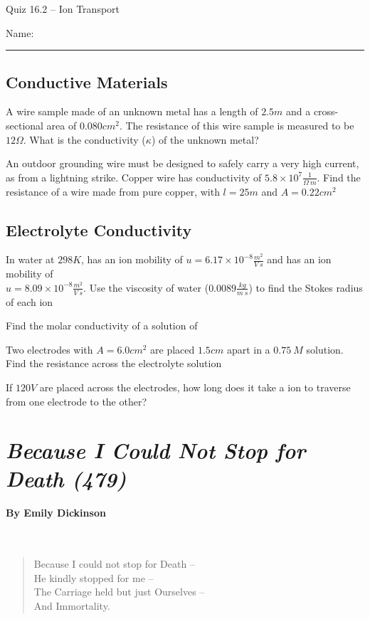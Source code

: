 \documentclass[11pt, letterpaper]{memoir}
\begin{document}
	\begin{center}
		{\large Quiz 16.2 -- Ion Transport}
	\end{center}
	{\large Name: \rule[-1mm]{4in}{.1pt} 


\subsection*{Conductive Materials}
A wire sample made of an unknown metal has a length of $2.5m$ and a cross-sectional area of $0.080cm^2$. The resistance of this wire sample is measured to be $12\Omega$. What is the conductivity ($\kappa$) of the unknown metal?

\vspace{4em}\noindent
An outdoor grounding wire must be designed to safely carry a very high current, as from a lightning strike. Copper wire has conductivity of $5.8\times10^7\frac{1}{\Omega~m}$. Find the resistance of a wire made from pure copper, with $l=25m$ and $A=0.22cm^2$

\vspace{4em}
\subsection*{Electrolyte Conductivity}
In water at $298K$,  has an ion mobility of $u=6.17\times10^{-8}\frac{m^2}{V~s}$ and  has an ion mobility of \\$u=8.09\times10^{-8}\frac{m^2}{V~s}$. Use the viscosity of water ($0.0089\frac{kg}{m~s}$) to find the Stokes radius of each ion

\vspace{5em}\noindent
Find the molar conductivity of a solution of 

\vspace{4em}\noindent
Two electrodes with $A=6.0cm^2$ are placed $1.5cm$ apart in a $0.75~M$  solution. Find the resistance across the electrolyte solution

\vspace{6em}\noindent
If $120V$ are placed across the electrodes, how long does it take a  ion to traverse from one electrode to the other?


\newpage
\pagestyle{empty}
\addtocounter{page}{-1}	
\section*{\emph{Because I Could Not Stop for Death (479)}}
\paragraph{By Emily Dickinson}~
\begin{verse}
	Because I could not stop for Death –\\
	He kindly stopped for me –\\
	The Carriage held but just Ourselves –\\
	And Immortality.
	

\end{verse}}
\end{document}
